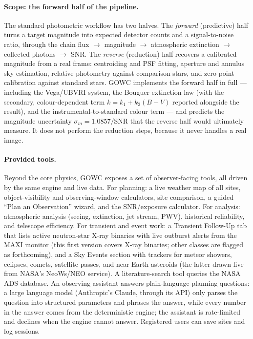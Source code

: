\documentclass[11pt]{article}
\begin{document}
\paragraph{Scope: the forward half of the pipeline.} The standard photometric
workflow has two halves. The \emph{forward} (predictive) half turns a target
magnitude into expected detector counts and a signal-to-noise ratio, through the
chain flux $\to$ magnitude $\to$ atmospheric extinction $\to$ collected photons
$\to$ SNR. The \emph{reverse} (reduction) half recovers a calibrated magnitude
from a real frame: centroiding and PSF fitting, aperture and annulus sky
estimation, relative photometry against comparison stars, and zero-point
calibration against standard stars. GOWC implements the forward half in full ---
including the Vega/UBVRI system, the Bouguer extinction law (with the secondary,
colour-dependent term $k = k_1 + k_2(B\!-\!V)$ reported alongside the result), and the
instrumental-to-standard colour term --- and predicts the magnitude uncertainty
$\sigma_m = 1.0857/\mathrm{SNR}$ that the reverse half would ultimately measure.
It does not perform the reduction steps, because it never handles a real image.

\paragraph{Provided tools.} Beyond the core physics, GOWC exposes a set of
observer-facing tools, all driven by the same engine and live data. For
planning: a live weather map of all sites, object-visibility and observing-window
calculators, site comparison, a guided ``Plan an Observation'' wizard, and the
SNR/exposure calculator. For analysis: atmospheric analysis (seeing, extinction,
jet stream, PWV), historical reliability, and telescope efficiency. For transient
and event work: a Transient Follow-Up tab that lists active neutron-star X-ray
binaries with live outburst alerts from the MAXI monitor (this first version
covers X-ray binaries; other classes are flagged as forthcoming), and a Sky
Events section with trackers for meteor showers, eclipses, comets, satellite
passes, and near-Earth asteroids (the latter drawn live from NASA's NeoWs/NEO
service). A literature-search tool queries the NASA ADS database. An observing
assistant answers plain-language planning questions: a large language model
(Anthropic's Claude, through its API) only parses the question into structured
parameters and phrases the answer, while every number in the answer comes from the
deterministic engine; the assistant is rate-limited and declines when the engine
cannot answer. Registered users can save sites and log sessions.
\end{document}
